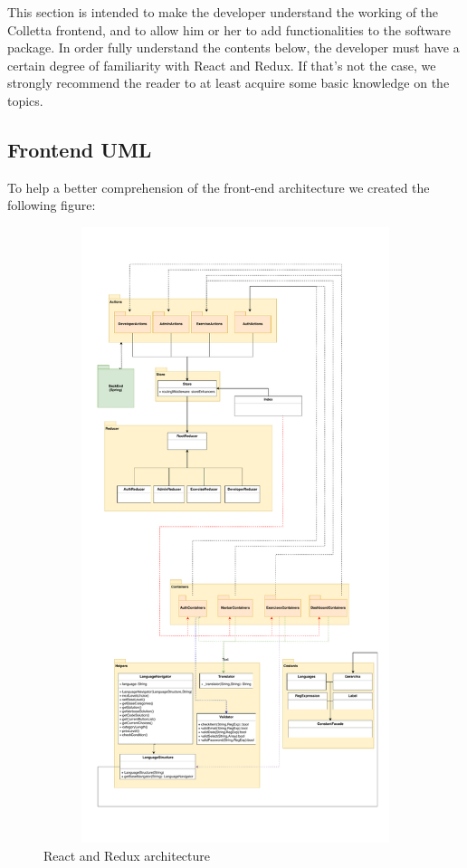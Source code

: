 This section is intended to make the developer understand the working of the Colletta frontend, and to allow him or her to add functionalities  to the software package.
In order fully understand the contents below, the developer must have a certain degree of familiarity with React and Redux. If that's not the case, we strongly recommend the reader to at least acquire some basic knowledge on the topics.
\subsection{Frontend UML}
To help a better comprehension of the front-end architecture we created the following figure:
\begin{figure}
\centering 
\includegraphics[width=15cm, height=18cm]{uml/reactredux.pdf} 
\caption{React and Redux architecture}
\end{figure}
